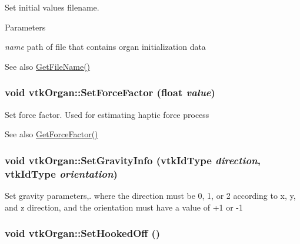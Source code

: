 Set initial values filename. 
\begin{DoxyParams}{Parameters}
\item[{\em name}]path of file that contains organ initialization data \end{DoxyParams}
\begin{DoxySeeAlso}{See also}
\hyperlink{classvtkOrgan_a83331bddcf2a07b54a5df5e6e23b130f}{GetFileName()} 
\end{DoxySeeAlso}
\hypertarget{classvtkOrgan_ae98b19d50a8f351e79e881b579215953}{
\subsubsection[{SetForceFactor}]{\setlength{\rightskip}{0pt plus 5cm}void vtkOrgan::SetForceFactor (float {\em value})}}
\label{classvtkOrgan_ae98b19d50a8f351e79e881b579215953}


Set force factor. Used for estimating haptic force process \begin{DoxySeeAlso}{See also}
\hyperlink{classvtkOrgan_a81b39e0f98712affccd17071791f6ad7}{GetForceFactor()} 
\end{DoxySeeAlso}
\hypertarget{classvtkOrgan_ae3f6ea53f0d615fae5f9e2796e4075a2}{
\subsubsection[{SetGravityInfo}]{\setlength{\rightskip}{0pt plus 5cm}void vtkOrgan::SetGravityInfo (vtkIdType {\em direction}, \/  vtkIdType {\em orientation})}}
\label{classvtkOrgan_ae3f6ea53f0d615fae5f9e2796e4075a2}


Set gravity parameters,. where the direction must be 0, 1, or 2 according to x, y, and z direction, and the orientation must have a value of +1 or -\/1 \hypertarget{classvtkOrgan_ad2ac78a6020fba61ff49edad8a3f6a22}{
\subsubsection[{SetHookedOff}]{\setlength{\rightskip}{0pt plus 5cm}void vtkOrgan::SetHookedOff ()}}
\label{classvtkOrgan_ad2ac78a6020fba61ff49edad8a3f6a22}


